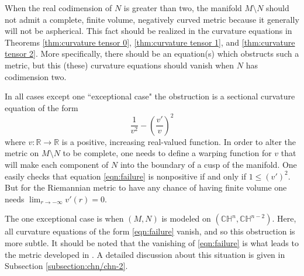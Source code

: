 \documentclass[10pt]{amsart}
\def\R{\mathbb{R}}
\def\H{\mathbb{H}}
\def\C{\mathbb{C}}
\theoremstyle{definition}
\theoremstyle{remark}
\numberwithin{equation}{section}
\begin{document}
When the real codimension of $N$ is greater than two, the manifold $M \setminus N$ should not admit a complete, finite volume, negatively curved metric because it generally will not be aspherical.  
This fact should be realized in the curvature equations in Theorems \ref{thm:curvature tensor 0}, \ref{thm:curvature tensor 1}, and \ref{thm:curvature tensor 2}.  
More specifically, there should be an equation(s) which obstructs such a metric, but this (these) curvature equations should vanish when $N$ has codimension two.

In all cases except one ``exceptional case" the obstruction is a sectional curvature equation of the form
	\begin{equation}\label{eqn:failure}
	\frac{1}{v^2} - \left( \frac{v'}{v} \right)^2
	\end{equation}
where $v: \R \to \R$ is a positive, increasing real-valued function.  
In order to alter the metric on $M \setminus N$ to be complete, one needs to define a warping function for $v$ that will make each component of $N$ into the boundary of a cusp of the manifold.  
One easily checks that equation \eqref{eqn:failure} is nonpositive if and only if $1 \leq (v')^2$.  
But for the Riemannian metric to have any chance of having finite volume one needs $\lim_{r \to - \infty} v'(r) = 0$.  


The one exceptional case is when $(M, N)$ is modeled on $(\C \H^n, \C \H^{n-2})$.  
Here, all curvature equations of the form \eqref{eqn:failure} vanish, and so this obstruction is more subtle.  
It should be noted that the vanishing of \eqref{eqn:failure} is what leads to the metric developed in \cite{Min negative distribution}.  
A detailed discussion about this situation is given in Subsection \ref{subsection:chn/chn-2}.
\end{document}
